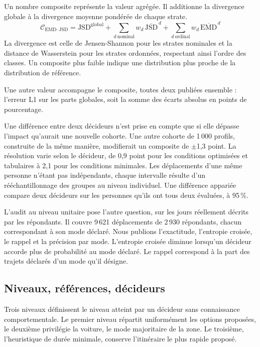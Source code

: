 Un nombre composite représente la valeur agrégée. Il additionne la divergence globale à la divergence moyenne pondérée de chaque strate.
\[
  \mathcal{C}_{\text{EMD--JSD}} = \mathrm{JSD}^{\text{global}}
  + \sum_{d\ \text{nominal}} w_d\,\overline{\mathrm{JSD}}^{\,d}
  + \sum_{d\ \text{ordinal}} w_d\,\overline{\mathrm{EMD}}^{\,d}
\]
La divergence est celle de Jensen-Shannon pour les strates nominales et la distance de Wasserstein pour les strates ordonnées, respectant ainsi l'ordre des classes. Un composite plus faible indique une distribution plus proche de la distribution de référence.

Une autre valeur accompagne le composite, toutes deux publiées ensemble : l'erreur L1 sur les parts globales, soit la somme des écarts absolus en points de pourcentage.

Une différence entre deux décideurs n'est prise en compte que si elle dépasse l'impact qu'aurait une nouvelle cohorte. Une autre cohorte de 1\,000 profils, construite de la même manière, modifierait un composite de $\pm$1,3 point. La résolution varie selon le décideur, de 0,9 point pour les conditions optimisées et tabulaires à 2,1 pour les conditions minimales. Les déplacements d'une même personne n'étant pas indépendants, chaque intervalle résulte d'un rééchantillonnage des groupes au niveau individuel. Une différence appariée compare deux décideurs sur les personnes qu'ils ont tous deux évaluées, à 95\,\%.

L'audit au niveau unitaire pose l'autre question, sur les jours réellement décrits par les répondants. Il couvre 9\,621 déplacements de 2\,930 répondants, chacun correspondant à son mode déclaré. Nous publions l'exactitude, l'entropie croisée, le rappel et la précision par mode. L'entropie croisée diminue lorsqu'un décideur accorde plus de probabilité au mode déclaré. Le rappel correspond à la part des trajets déclarés d'un mode qu'il désigne.

\subsection{Niveaux, références, décideurs}
\label{sec:deciders}

Trois niveaux définissent le niveau atteint par un décideur sans connaissance comportementale. Le premier niveau répartit uniformément les options proposées, le deuxième privilégie la voiture, le mode majoritaire de la zone. Le troisième, l'heuristique de durée minimale, conserve l'itinéraire le plus rapide proposé.

